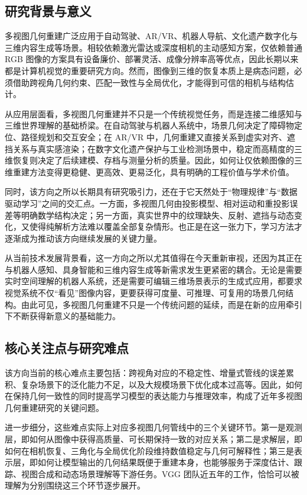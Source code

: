\subsection{研究背景与意义}

多视图几何重建广泛应用于自动驾驶、AR/VR、机器人导航、文化遗产数字化与三维内容生成等场景。相较依赖激光雷达或深度相机的主动感知方案，仅依赖普通 RGB 图像的方案具有设备廉价、部署灵活、成像分辨率高等优点，因此长期以来都是计算机视觉的重要研究方向\cite{schoenberger2016colmap,reizenstein2021co3d}。然而，图像到三维的恢复本质上是病态问题，必须借助跨视角几何约束、匹配一致性与全局优化，才能得到可信的相机与结构估计。

从应用层面看，多视图几何重建并不只是一个传统视觉任务，而是连接二维感知与三维世界理解的基础桥梁。在自动驾驶与机器人系统中，场景几何决定了障碍物定位、路径规划和交互安全；在 AR/VR 中，几何重建又直接关系到虚实对齐、遮挡关系与真实感渲染；在数字文化遗产保护与工业检测场景中，稳定而高精度的三维恢复则决定了后续建模、存档与测量分析的质量。因此，如何让仅依赖图像的三维重建方法变得更稳健、更高效、更易泛化，具有明确的工程价值与学术价值。

同时，该方向之所以长期具有研究吸引力，还在于它天然处于“物理规律”与“数据驱动学习”之间的交汇点。一方面，多视图几何由投影模型、相对运动和重投影误差等明确数学结构决定；另一方面，真实世界中的纹理缺失、反射、遮挡与动态变化，又使得纯解析方法难以覆盖全部复杂情形。也正是在这一张力下，学习方法才逐渐成为推动该方向继续发展的关键力量。

从当前技术发展背景看，这一方向之所以尤其值得在今天重新审视，还因为其正在与机器人感知、具身智能和三维内容生成等新需求发生更紧密的耦合。无论是需要实时空间理解的机器人系统，还是需要可编辑三维场景表示的生成式应用，都要求视觉系统不仅“看见”图像内容，更要获得可度量、可推理、可复用的场景几何结构。由此可见，多视图几何重建不只是一个传统问题的延续，而是在新的应用牵引下不断获得新意义的基础能力。

\subsection{核心关注点与研究难点}

该方向当前的核心难点主要包括：跨视角对应的不稳定性、增量式管线的误差累积、复杂场景下的泛化能力不足，以及大规模场景下优化成本过高等\cite{wang2021deep2view,karaev2024cotracker,wang2024vggsfm}。因此，如何在保持几何一致性的同时提高学习模型的表达能力与推理效率，构成了近年多视图几何重建研究的关键问题。

进一步细分，这些难点实际上对应多视图几何管线中的三个关键环节。第一是观测层，即如何从图像中获得高质量、可长期保持一致的对应关系；第二是求解层，即如何在相机恢复、三角化与全局优化阶段维持数值稳定与几何可解释性；第三是表示层，即如何让模型输出的几何结果既便于重建本身，也能够服务于深度估计、跟踪、视图合成和动态场景理解等下游任务。VGG 团队近五年的工作，恰恰可以被理解为分别围绕这三个环节逐步展开。

